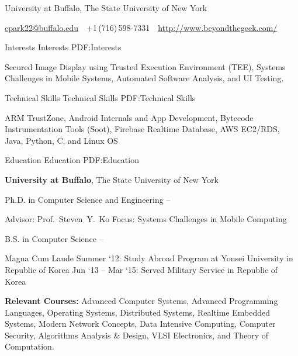 \documentclass[letterpaper,MMMyyyy,nonstopmode]{simpleresumecv}
\newcommand{\CVAuthor}{Chang Min Park}
\newcommand{\CVWebpage}{http://www.beyondthegeek.com/}
\begin{document}

\Title{\CVAuthor}

\begin{SubTitle}
University at Buffalo, The State University of New York
\par
\href{mailto:cpark22@buffalo.edu}
{cpark22@buffalo.edu}
\,\SubBulletSymbol\,
+1\,(716)\,598-7331
\,\SubBulletSymbol\,
\href{\CVWebpage}
{\url{\CVWebpage}}
\end{SubTitle}

\begin{Body}

\Section
{Interests}
{Interests}
{PDF:Interests}

\Entry
Secured Image Display using Trusted Execution Environment (TEE), Systems Challenges in Mobile Systems, 
Automated Software Analysis, and UI Testing.

\Section
{Technical Skills}
{Technical Skills}
{PDF:Technical Skills}

\Entry
ARM TrustZone, Android Internals and App Development, Bytecode Instrumentation Tools (Soot),
Firebase Realtime Database, AWS EC2/RDS, Java, Python, C, and Linux OS

\Section
{Education}
{Education}
{PDF:Education}

\Entry
\textbf{University at Buffalo}, The State University of New York

\Gap
\BulletItem
Ph.D. in Computer Science and Engineering
\hfill
{} --
\begin{Detail}
\SubBulletItem
Advisor:
Prof.~Steven~Y.~Ko
\SubBulletItem
Focus:
Systems Challenges in Mobile Computing
\end{Detail}

\Gap
\BulletItem
B.S. in Computer Science
\hfill
{} --
\begin{Detail}
\SubBulletItem
Magna Cum Laude
\SubBulletItem
Summer `12: Study Abroad Program at Yonsei University in Republic of Korea
\SubBulletItem
Jun `13 -- Mar `15: Served Military Service in Republic of Korea
\end{Detail}

\BigGap
\Entry
\textbf{Relevant Courses:} Advanced Computer Systems, Advanced Programming Languages, 
Operating Systems, Distributed Systems, Realtime Embedded Systems, Modern Network Concepts, 
Data Intensive Computing, Computer Security, Algorithms Analysis \& Design,
VLSI Electronics, and Theory of Computation.



\end{Body}
\end{document}
